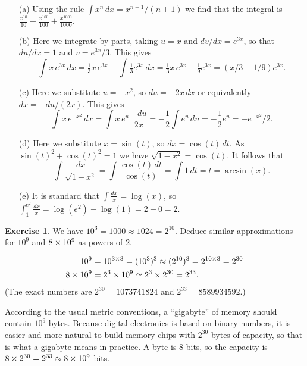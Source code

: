 \documentclass[a4paper]{amsart}
\theoremstyle{definition}
\newtheorem{exercise}{Exercise}[section]
\newenvironment{solution}{{\noindent \bf Solution:}}{}
\begin{document}
\begin{solution}
\begin{itemize}
  \item[(a)] Using the rule $\int x^n\,dx=x^{n+1}/(n+1)$ we find that
    the integral is 
    $\displaystyle
      \frac{x^{10}}{10}+\frac{x^{100}}{100}+\frac{x^{1000}}{1000}$.
  \item[(b)] Here we integrate by parts, taking $u=x$ and
    $dv/dx=e^{3x}$, so that $du/dx=1$ and $v=e^{3x}/3$.  This gives 
    \[ \int x\,e^{3x}\,dx = \tfrac{1}{3}x\,e^{3x} - 
        \int \tfrac{1}{3}e^{3x}\,dx = 
        \tfrac{1}{3}x\,e^{3x} - \tfrac{1}{9}e^{3x} = 
        (x/3-1/9)e^{3x}.
    \] 
  \item[(c)] Here we substitute $u=-x^2$, so $du=-2x\,dx$ or
    equivalently $dx=-du/(2x)$.  This gives
    \[ \int x\,e^{-x^2}\,dx = 
        \int x\,e^u\,\frac{-du}{2x} = 
        -\frac{1}{2}\int e^u\, du = 
        -\frac{1}{2}e^u = -e^{-x^2}/2.
    \]
  \item[(d)] Here we substitute $x=\sin(t)$, so $dx=\cos(t)\,dt$.  As
    $\sin(t)^2+\cos(t)^2=1$ we have $\sqrt{1-x^2}=\cos(t)$.  It
    follows that 
    \[ \int\frac{dx}{\sqrt{1-x^2}} = \int\frac{\cos(t)\,dt}{\cos(t)}
        = \int 1\,dt = t = \arcsin(x).
    \]
  \item[(e)] It is standard that $\int\frac{dx}{x}=\log(x)$, so
    $\int_1^{e^2}\frac{dx}{x}=\log(e^2)-\log(1)=2-0=2$.
 \end{itemize}
\end{solution}

\begin{exercise}\label{ex-giga}
We have $10^3=1000\approx 1024=2^{10}$.  Deduce similar
 approximations for $10^9$ and $8\times 10^9$ as powers of $2$.
\end{exercise}
\begin{solution}
\begin{align*}
  10^9 &=10^{3\times 3}=(10^3)^3\approx(2^{10})^3=2^{10\times 3}=2^{30}\\
  8\times 10^9 &= 2^3\times 10^9\simeq 2^3\times 2^{30} = 2^{33}.
 \end{align*}
 (The exact numbers are $2^{30}=1073741824$ and $2^{33}=8589934592$.)

 According to the usual metric conventions, a ``gigabyte'' of memory
 should contain $10^9$ bytes.  Because digital electronics is based on
 binary numbers, it is easier and more natural to build memory chips
 with $2^{30}$ bytes of capacity, so that is what a gigabyte means in
 practice.  A byte is $8$ bits, so the capacity is
 $8\times 2^{30}=2^{33}\approx 8\times 10^9$ bits.
\end{solution}
\end{document}
